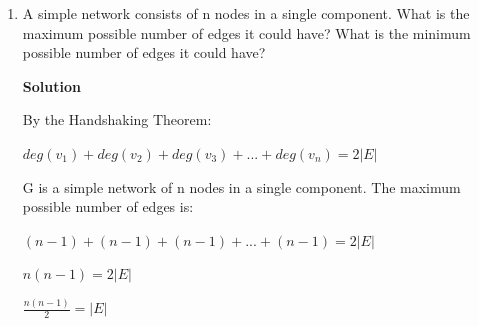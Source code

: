 \documentclass{amsart}
\theoremstyle{definition}
\theoremstyle{remark}
\numberwithin{equation}{section}
\begin{document}
\begin{enumerate}
\vspace{0.5cm}
\textbf{ \larger[3]Solution} 
\vspace{0.5cm}

\begin{enumerate}
    \item The internet, at the level of autonomous systems
    
        Undirected, Acyclic, Approximately planar 
        \vspace{0.5cm}
    \item A food web
        
        Directed, Cyclic 
        \vspace{0.5cm}
    \item The stem and branches of a plant
        
        Tree, Acyclic 
        \vspace{0.5cm}
    \item A spider web
        
        Undirected, Planar 
        \vspace{0.5cm}
    \item A complete clique of four nodes
        
        Undirected, Cyclic 
        \vspace{0.5cm}
\end{enumerate}
\vspace{5cm}
\clearpage
\item A simple network consists of n nodes in a single component. What is the maximum possible number of edges it could have? What is the minimum possible number of edges it could have? 

\vspace{0.5cm}
\textbf{ \larger[3]Solution} 
\vspace{0.5cm}

By the Handshaking Theorem:

$deg(v_1)+deg(v_2)+deg(v_3)+...+deg(v_n)=2|E|$

G is a simple network  of n nodes in a single component. The maximum possible number of edges is:

$(n-1)+(n-1)+(n-1)+...+(n-1)=2|E|$

$n\left(n-1\right)=2|E|$

$\frac{n\left(n-1\right)}{2}=|E|$
\end{enumerate}
\end{document}
